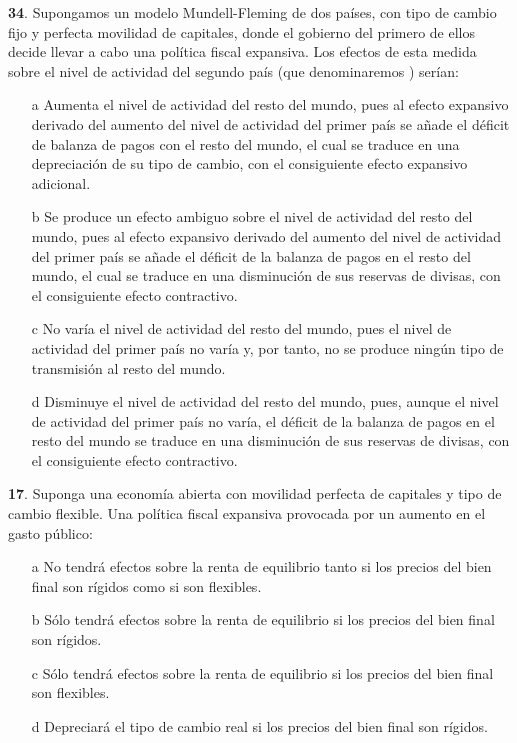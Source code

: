 \documentclass{nuevotema}
\begin{document}
\textbf{34}. Supongamos un modelo Mundell-Fleming de dos países, con tipo de cambio fijo y perfecta movilidad de capitales, donde el gobierno del primero de ellos decide llevar a cabo una política fiscal expansiva. Los efectos de esta medida sobre el nivel de actividad del segundo país (que denominaremos ) serían:
\begin{enumerate}
	\item[a] Aumenta el nivel de actividad del resto del mundo, pues al efecto expansivo derivado del aumento del nivel de actividad del primer país se añade el déficit de balanza de pagos con el resto del mundo, el cual se traduce en una depreciación de su tipo de cambio, con el consiguiente efecto expansivo adicional.
	\item[b] Se produce un efecto ambiguo sobre el nivel de actividad del resto del mundo, pues al efecto expansivo derivado del aumento del nivel de actividad del primer país se añade el déficit de la balanza de pagos en el resto del mundo, el cual se traduce en una disminución de sus reservas de divisas, con el consiguiente efecto contractivo.
	\item[c] No varía el nivel de actividad del resto del mundo, pues el nivel de actividad del primer país no varía y, por tanto, no se produce ningún tipo de transmisión al resto del mundo.
	\item[d] Disminuye el nivel de actividad del resto del mundo, pues, aunque el nivel de actividad del primer país no varía, el déficit de la balanza de pagos en el resto del mundo se traduce en una disminución de sus reservas de divisas, con el consiguiente efecto contractivo.
\end{enumerate}


\textbf{17}. Suponga una economía abierta  con movilidad perfecta de capitales y tipo de cambio flexible. Una política fiscal expansiva provocada por un aumento en el gasto público:
\begin{enumerate}
	\item[a] No tendrá efectos sobre la renta de equilibrio tanto si los precios del bien final son rígidos como si son flexibles.
	\item[b] Sólo tendrá efectos sobre la renta de equilibrio si los precios del bien final son rígidos.
	\item[c] Sólo tendrá efectos sobre la renta de equilibrio si los precios del bien final son flexibles.
	\item[d] Depreciará el tipo de cambio real si los precios del bien final son rígidos.
\end{enumerate}
\end{document}
